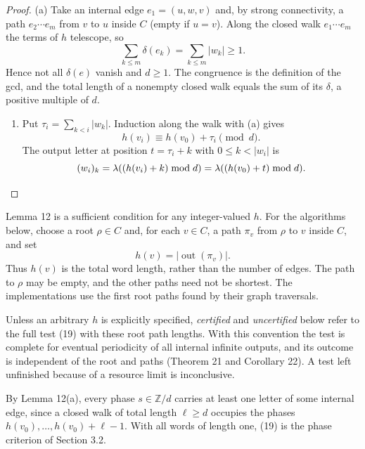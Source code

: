 \documentclass[11pt,reqno]{amsart}
\theoremstyle{definition}
\theoremstyle{remark}
\providecommand{\tightlist}{\setlength{\itemsep}{0pt}\setlength{\parskip}{0pt}}
\begin{document}
\begin{proof}\leavevmode\label{proof:12}
(a) Take an internal edge \(e_1=(u,w,v)\) and, by strong
connectivity, a path \(e_2\cdots e_m\) from \(v\) to \(u\) inside \(C\)
(empty if \(u=v\)). Along the closed walk \(e_1\cdots e_m\) the terms of
\(h\) telescope, so
\[
\sum_{k\le m}\delta(e_k)=\sum_{k\le m}|w_k|\ge1.
\]
Hence not all \(\delta(e)\) vanish and \(d\ge1\). The congruence is the
definition of the gcd, and the total length of a nonempty closed walk equals the
sum of its \(\delta\), a positive multiple of \(d\).

\begin{enumerate}
\def\labelenumi{(\alph{enumi})}
\setcounter{enumi}{1}
\tightlist
\item
  Put \(\tau_i=\sum_{k<i}|w_k|\). Induction along the walk with (a)
  gives
  \[
  h(v_i)\equiv h(v_0)+\tau_i\pmod d.
  \]
  The output letter at
  position \(t=\tau_i+k\) with \(0\le k<|w_i|\) is
  \[
  (w_i)_k=\lambda((h(v_i)+k)\bmod d)=\lambda((h(v_0)+t)\bmod d).\qedhere
\]
\end{enumerate}
\end{proof}

Lemma 12 is a sufficient condition for any integer-valued \(h\).
For the algorithms below, choose a root \(\rho\in C\) and, for each
\(v\in C\), a path \(\pi_v\) from \(\rho\) to \(v\) inside \(C\),
and set
\[
h(v)=|\operatorname{out}(\pi_v)|.
\]
Thus \(h(v)\) is the total word length, rather than the number of
edges. The path to \(\rho\) may be empty, and the other paths need not
be shortest. The implementations use the first root paths found by
their graph traversals.

Unless an arbitrary \(h\) is explicitly specified, \emph{certified} and
\emph{uncertified} below refer to the full test (19) with these root path
lengths. With this convention the test is complete for eventual
periodicity of all internal infinite outputs, and its outcome is
independent of the root and paths (Theorem 21 and Corollary 22).
A test left unfinished because of a resource limit is inconclusive.

By Lemma 12(a), every phase \(s\in\mathbb Z/d\) carries at
least one letter of some internal edge, since a closed walk of total
length \(\ell\ge d\) occupies the phases
\(h(v_0),\ldots,h(v_0)+\ell-1\). With all words of length one, (19)
is the phase criterion of Section 3.2.
\end{document}
